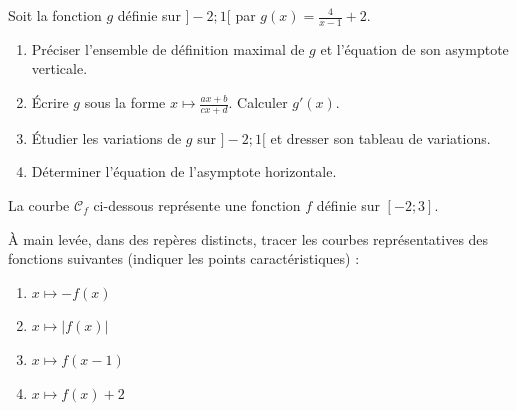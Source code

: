 \documentclass[11pt]{article}
\begin{document}
\begin{exercice}
Soit la fonction $g$ définie sur $]-2 ; 1[$ par $g(x) = \frac{4}{x-1} + 2$.
\begin{enumerate}
    \item Préciser l'ensemble de définition maximal de $g$ et l'équation de son asymptote verticale.
    \item Écrire $g$ sous la forme $x \mapsto \frac{ax+b}{cx+d}$. Calculer $g'(x)$.
    \item Étudier les variations de $g$ sur $]-2 ; 1[$ et dresser son tableau de variations.
    \item Déterminer l'équation de l'asymptote horizontale.
\end{enumerate}
\end{exercice}

\begin{exercice}
La courbe $\mathcal{C}_f$ ci-dessous représente une fonction $f$ définie sur $[-2 ; 3]$. 
\begin{center}
\end{center}
À main levée, dans des repères distincts, tracer les courbes représentatives des fonctions suivantes (indiquer les points caractéristiques) :
\begin{enumerate}
    \item $x \mapsto -f(x)$
    \item $x \mapsto |f(x)|$
    \item $x \mapsto f(x-1)$
    \item $x \mapsto f(x) + 2$
\end{enumerate}
\end{exercice}
\end{document}
